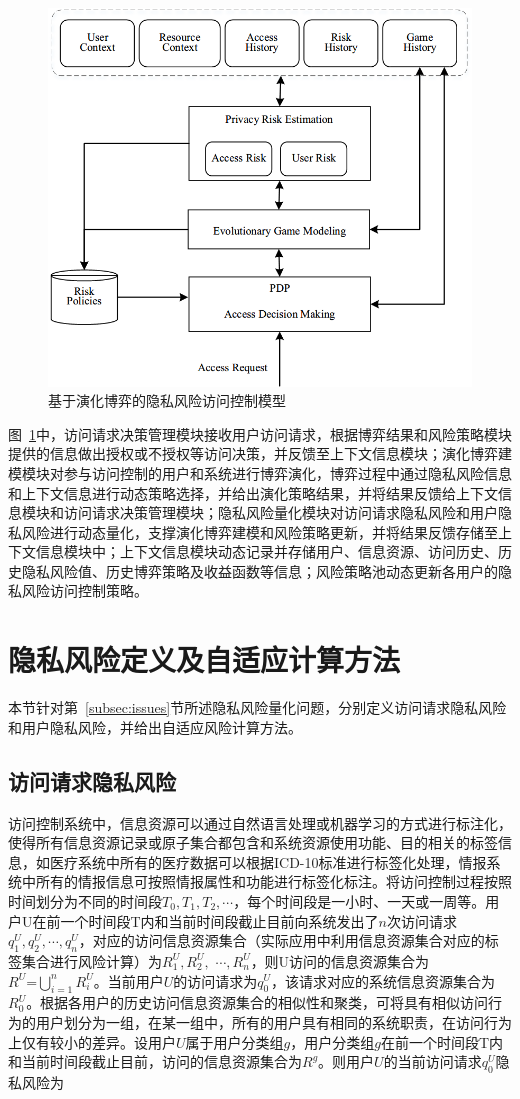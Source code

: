 \begin{figure}[htbp]
	\centering
	\includegraphics[width = 0.6\linewidth]{./figures/Evolutionary-game-Rabac.png}
	\caption{基于演化博弈的隐私风险访问控制模型}
	\label{fig:Evolutionary-game-Rabac}
\end{figure}

图~\ref{fig:Evolutionary-game-Rabac}中，访问请求决策管理模块接收用户访问请求，根据博弈结果和风险策略模块提供的信息做出授权或不授权等访问决策，并反馈至上下文信息模块；演化博弈建模模块对参与访问控制的用户和系统进行博弈演化，博弈过程中通过隐私风险信息和上下文信息进行动态策略选择，并给出演化策略结果，并将结果反馈给上下文信息模块和访问请求决策管理模块；隐私风险量化模块对访问请求隐私风险和用户隐私风险进行动态量化，支撑演化博弈建模和风险策略更新，并将结果反馈存储至上下文信息模块中；上下文信息模块动态记录并存储用户、信息资源、访问历史、历史隐私风险值、历史博弈策略及收益函数等信息；风险策略池动态更新各用户的隐私风险访问控制策略。

\section{隐私风险定义及自适应计算方法}
本节针对第~\ref{subsec:issues}节所述隐私风险量化问题，分别定义访问请求隐私风险和用户隐私风险，并给出自适应风险计算方法。
\subsection{访问请求隐私风险}

访问控制系统中，信息资源可以通过自然语言处理或机器学习的方式进行标注化，使得所有信息资源记录或原子集合都包含和系统资源使用功能、目的相关的标签信息，如医疗系统中所有的医疗数据可以根据ICD-10标准进行标签化处理，情报系统中所有的情报信息可按照情报属性和功能进行标签化标注。将访问控制过程按照时间划分为不同的时间段${{T}_{0}},{{T}_{1}},{{T}_{2}},\cdots $，每个时间段是一小时、一天或一周等。用户U在前一个时间段T内和当前时间段截止目前向系统发出了$n$次访问请求$q_{1}^{U},q_{2}^{U},\cdots ,q_{n}^{U}$，对应的访问信息资源集合（实际应用中利用信息资源集合对应的标签集合进行风险计算）为$R_{1}^{U},R_{2}^{U},$ $\cdots ,R_{n}^{U}$，则U访问的信息资源集合为$R_{{}}^{U}\text{=}\bigcup\nolimits_{i=1}^{n}{R_{i}^{U}}$。当前用户$U$的访问请求为$q_{0}^{U}$，该请求对应的系统信息资源集合为$R_{0}^{U}$。根据各用户的历史访问信息资源集合的相似性和聚类，可将具有相似访问行为的用户划分为一组，在某一组中，所有的用户具有相同的系统职责，在访问行为上仅有较小的差异。设用户$U$属于用户分类组$g$，用户分类组$g$在前一个时间段T内和当前时间段截止目前，访问的信息资源集合为$R_{{}}^{g}$。则用户$U$的当前访问请求$q_{0}^{U}$隐私风险为

